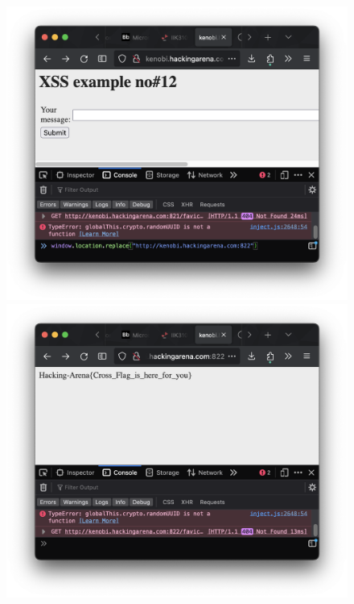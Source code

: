 \begin{figure}[H]
    \centering
    \begin{minipage}{.5\textwidth}
        \hspace*{-1cm}
        \centerline{\includegraphics[width=1.4\textwidth]{img/Web hacking/Redirect/Skjermbilde 2023-10-26 kl. 15.29.27.png}}
        \vspace*{-.5cm}
    \end{minipage}%
    \begin{minipage}{.5\textwidth}
        \hspace*{1cm}
        \centerline{\includegraphics[width=1.4\textwidth]{img/Web hacking/Redirect/Skjermbilde 2023-10-26 kl. 15.29.41.png}}
        \vspace*{-1 cm}
    \end{minipage}
\end{figure}

